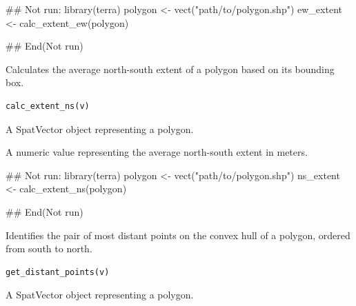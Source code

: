 \documentclass[letterpaper]{book}
\begin{document}
%
\begin{Examples}
\begin{ExampleCode}
## Not run: 
library(terra)
polygon <- vect("path/to/polygon.shp")
ew_extent <- calc_extent_ew(polygon)

## End(Not run)
\end{ExampleCode}
\end{Examples}
%
\begin{Description}
Calculates the average north-south extent of a polygon based on its bounding box.
\end{Description}
%
\begin{Usage}
\begin{verbatim}
calc_extent_ns(v)
\end{verbatim}
\end{Usage}
%
\begin{Arguments}
\begin{ldescription}
\item[\code{v}] A SpatVector object representing a polygon.
\end{ldescription}
\end{Arguments}
%
\begin{Value}
A numeric value representing the average north-south extent in meters.
\end{Value}
%
\begin{Examples}
\begin{ExampleCode}
## Not run: 
library(terra)
polygon <- vect("path/to/polygon.shp")
ns_extent <- calc_extent_ns(polygon)

## End(Not run)
\end{ExampleCode}
\end{Examples}
%
\begin{Description}
Identifies the pair of most distant points on the convex hull of a polygon,
ordered from south to north.
\end{Description}
%
\begin{Usage}
\begin{verbatim}
get_distant_points(v)
\end{verbatim}
\end{Usage}
%
\begin{Arguments}
\begin{ldescription}
\item[\code{v}] A SpatVector object representing a polygon.
\end{ldescription}
\end{Arguments}
\end{document}
